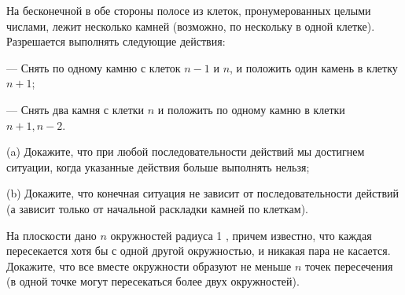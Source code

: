 На бесконечной в обе стороны полосе из клеток, пронумерованных целыми числами, лежит несколько камней (возможно, по нескольку в одной клетке). Разрешается выполнять следующие действия:

--- Снять по одному камню с клеток $n-1$ и $n$, и положить один камень в клетку $n+1$;

--- Снять два камня с клетки $n$ и положить по одному камню в клетки $n+1, n-2$.

(a) Докажите, что при любой последовательности действий мы достигнем ситуации, когда указанные действия больше выполнять нельзя;

(b) Докажите, что конечная ситуация не зависит от последовательности действий (а зависит только от начальной раскладки камней по клеткам).

На плоскости дано $n$ окружностей радиуса 1 , причем известно, что каждая пересекается хотя бы с одной другой окружностью, и никакая пара не касается. Докажите, что все вместе окружности образуют не меньше $n$ точек пересечения (в одной точке могут пересекаться более двух окружностей).